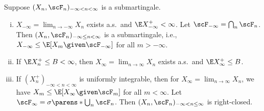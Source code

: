 \documentclass[../aipt.tex]{subfiles}
\begin{document}
\begin{Theorem}\label{wk15:Submartingale_Convergence}
Suppose $(X_n,\scF_n)_{-\infty<n<\infty}$ is a submartingale.
\begin{enumerate}[(i)]
	\item\label{wk15:-inftyconv} $X_{-\infty} = \lim_{n\to-\infty} X_n$ exists a.s.\ and $\E X_{-\infty}^+ < \infty$. Let $\scF_{-\infty}=\bigcap_n \scF_n$. Then $(X_n,\scF_n)_{-\infty\leq n<\infty}$ is a submartingale, i.e., $X_{-\infty} \leq \E[ X_m \given \scF_{-\infty}]$ for all $m>-\infty$. 
	\item\label{wk15:inftyconv} If $\E X_n^+ \leq B <\infty$, then $X_\infty = \lim_{n\to\infty} X_n$ exists a.s.\ and $\E X_\infty^+ \leq B$. 
	\item\label{wk15:ui} If $(X_n^+)_{-\infty<n<\infty}$ is uniformly integrable, then for $X_\infty=\lim_{n\to\infty} X_n$, we have $X_m \leq \E[ X_{\infty} \given \scF_m]$ for all $m < \infty$. Let $\scF_\infty = \sigma\parens*{\bigcup_n \scF_n}$. Then $(X_n,\scF_n)_{-\infty<n\leq\infty}$ is right-closed.
\end{enumerate}
\end{Theorem}
\end{document}
